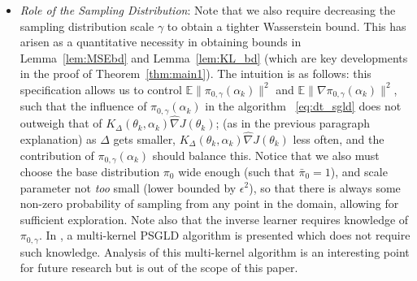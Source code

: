 \documentclass[journal,onecolumn]{IEEEtran}
\newcommand{\alk}{\alpha_k}
\newcommand{\thk}{\theta_k}
\newcommand{\step}{\epsilon}
\newcommand{\grad}{\nabla}
\newcommand{\gradn}{\hat{\nabla}}
\newcommand{\rew}{J}
\newcommand{\CE}{\mathbb{E}}
\newcommand{\idistr}{\ids_0}
\newcommand{\K}{K}
\newcommand{\Kd}{\K_{\Delta}}
\newcommand{\ids}{\pi}
\newcommand{\idistmax}{\bar{\ids}_0}
\newcommand{\idw}{\gamma}
\newcommand{\isp}{0,\idw}
\newcommand{\idistrw}{\ids_{\isp}}
\begin{document}
\begin{itemize}
\begin{itemize}
        \item[-] \textit{Dependence on Kernel Structure}: 
    \end{itemize} 

    \item[-] \textit{Role of the Sampling Distribution}: Note that we also require decreasing the sampling distribution scale $\idw$ to obtain a tighter Wasserstein bound. This has arisen as a quantitative necessity in obtaining bounds in Lemma~\ref{lem:MSEbd} and Lemma~\ref{lem:KL_bd} (which are key developments in the proof of Theorem~\ref{thm:main1}). The intuition is as follows: this specification allows us to control $\CE\|\idistrw(\alk)\|^2$ and $\CE\|\grad\idistrw(\alk)\|^2$, such that the influence of $\idistrw(\alk)$ in the algorithm ~\eqref{eq:dt_sgld} does not outweigh that of $\Kd(\thk,\alk)\gradn\rew(\thk)$; (as in the previous paragraph explanation) as $\Delta$ gets smaller, $\Kd(\thk,\alk)\gradn\rew(\thk)$ \color{black}{surpasses any given positive threshold} less often, and the contribution of $\idistrw(\alk)$ should balance this. Notice that we also must choose the base distribution $\idistr$ wide enough (such that $\idistmax =  1$), and scale parameter not \textit{too} small (lower bounded by $\step^2$), so that there is always some non-zero probability of sampling from any point in the domain, allowing for sufficient exploration. {\color{black}Note also that the inverse learner requires knowledge of $\pi_{0,\gamma}$. In \cite{krishnamurthy2021langevin}, a multi-kernel PSGLD algorithm is presented which does not require such knowledge. Analysis of this multi-kernel algorithm is an interesting point for future research but is out of the scope of this paper.}

\end{itemize}
\end{document}
